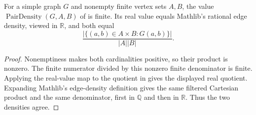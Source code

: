 \begin{lemma}
For a simple graph $G$ and nonempty finite vertex sets $A,B$, the value
$\operatorname{PairDensity}(G,A,B)$ of  is finite.
Its real value equals Mathlib's rational edge density, viewed in $\mathbb R$,
and both equal
\[
 \frac{|\{(a,b)\in A\times B:G(a,b)\}|}{|A||B|}.
\]
\end{lemma}
\begin{proof}
Nonemptiness makes both cardinalities positive, so their product is
nonzero. The finite numerator divided by this nonzero finite denominator
is finite. Applying the real-value map to the quotient in
 gives the displayed real quotient. Expanding
Mathlib's edge-density definition gives the same filtered Cartesian
product and the same denominator, first in $\mathbb Q$ and then in
$\mathbb R$. Thus the two densities agree.
\end{proof}
